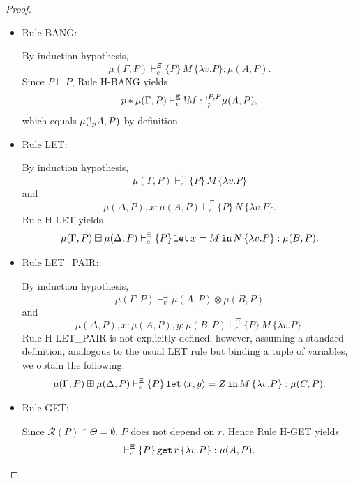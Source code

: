 \begin{proof}
\begin{itemize}
    \item Rule BANG:
    \begin{mathpar}
    \end{mathpar}
    By induction hypothesis,
    \[
        \mu(\Gamma,P) \vdash^{\Xi}_{c} \{P\}\, M \,\{\lambda v.P\}: \mu(A,P).
    \]
    Since $P \vdash P$, Rule H-BANG yields
    \[
    p * \mu(\Gamma,P)
    \vdash^{\Xi}_{v}
    \mathord{!} M
    :
    \mathord{!}_p^{P,P}\mu(A,P),
    \]
    which equals $\mu(\mathord{!}_p A,P)$ by definition.

    \item Rule LET:
    \begin{mathpar}
    \end{mathpar}
    By induction hypothesis,
    \[ \mu(\Gamma,P) \vdash^{\Xi}_{c} \{P\}\, M \,\{\lambda v.P\} \]
    and
    \[ \mu(\Delta,P),x:\mu(A,P) \vdash^{\Xi}_{c} \{P\}\, N \,\{\lambda v.P\}.\]
    Rule H-LET yields
    \[
        \mu(\Gamma,P)\boxplus\mu(\Delta,P) \vdash^{\Xi}_{c} \{P\}\, \mathtt{let}\,x=M\,\mathtt{in}\, N \,\{\lambda v.P\} : \mu(B,P).
    \]
    
    \item Rule LET\_PAIR:
    \begin{mathpar}
    \end{mathpar}
    By induction hypothesis,
    \[ \mu(\Gamma,P) \vdash^{\Xi}_{v} \mu(A, P) \otimes \mu(B, P) \]
    and
    \[ \mu(\Delta,P),x:\mu(A,P), y:\mu(B,P) \vdash^{\Xi}_{c} \{P\}\, M \,\{\lambda v.P\}.\]
    Rule H-LET\_PAIR is not explicitly defined, however, assuming a standard definition, analogous to the usual LET rule but binding a tuple of variables, we obtain the following:
    \[
        \mu(\Gamma,P)\boxplus\mu(\Delta,P) \vdash^{\Xi}_{c} \{P\}\, \mathtt{let}\,\langle x,y \rangle=Z\,\mathtt{in}\, M \,\{\lambda v.P\} : \mu(C,P).
    \]

    \item Rule GET:
    \begin{mathpar}
    \end{mathpar}
    Since $\mathcal R(P)\cap\Theta=\emptyset$, $P$ does not depend on $r$.
    Hence Rule H-GET yields
    \[ \vdash^{\Xi}_{c} \{P\}\, \mathtt{get}\, r \,\{\lambda v.P\} : \mu(A,P). \]


\end{itemize}
\end{proof}
